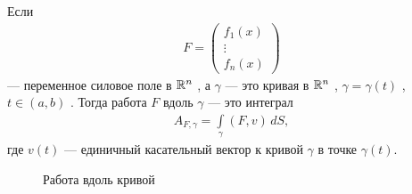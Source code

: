 Если
\begin{align*}
 F = \begin{pmatrix}
  f_1(x) \\
  \vdots \\
  f_n(x)
 \end{pmatrix}
\end{align*}  --- переменное силовое поле в $\mathbb{R}^{n}$ , а $\gamma$  --- это кривая в $\mathbb{R}^{n}$ , $\gamma = \gamma(t)$ , $t \in (a, b)$ . Тогда работа $F$  вдоль $\gamma$ --- это интеграл
\begin{align*}
 A_{F,\gamma} = \int\limits_{\gamma} (F,v) \, dS
,\end{align*} где $v(t)$ --- единичный касательный вектор к кривой $\gamma$  в точке $\gamma(t)$.

\begin{figure}[ht]
    \centering
    \caption{Работа вдоль кривой}
    \label{fig:work_under_a_curve}
\end{figure}


